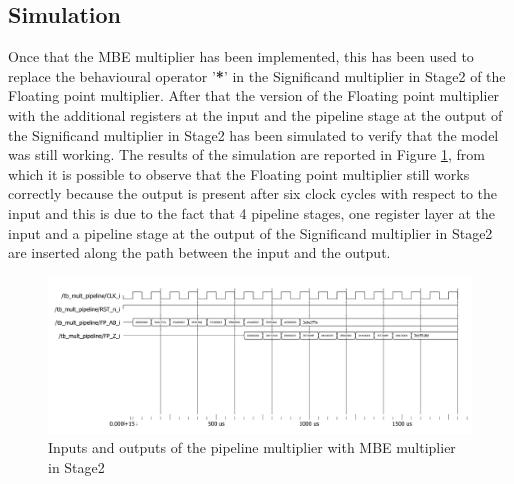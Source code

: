 \documentclass[a4paper, titlepage]{article}
\begin{document}
\subsection{Simulation}
Once that the MBE multiplier has been implemented, this has been used to replace the behavioural operator '\textbf{*}' in the Significand multiplier in Stage2 of the Floating point multiplier. 
\newline
After that the version of the Floating point multiplier with the additional registers at the input and the pipeline stage at the output of the Significand multiplier in Stage2 has been simulated to verify that the model was still working.
The results of the simulation are reported in Figure \ref{fig:sim_inreg_MBE}, from which it is possible to observe that the Floating point multiplier still works correctly because the output is present after six clock cycles with respect to the input and this is due to the fact that 4 pipeline stages, one register layer at the input and a pipeline stage at the output of the Significand multiplier in Stage2 are inserted along the path between the input and the output.
\begin{figure} [h]
\centering
\includegraphics[scale=0.45]{print_sim_inreg_stage2_MBE.png}
	\caption{Inputs and outputs of the pipeline multiplier with MBE multiplier in Stage2}
	\label{fig:sim_inreg_MBE}
\end{figure}
\end{document}
